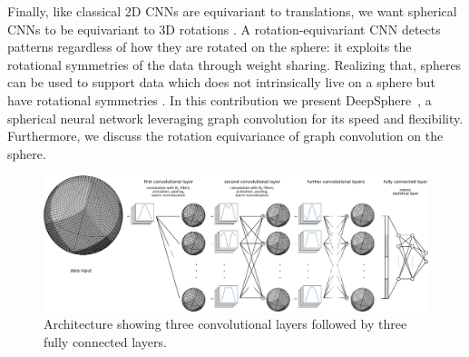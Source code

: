 \documentclass{article} %
\newcommand{\1}{\b{1}}              %
\newcommand{\0}{\b{0}}              %
\newcommand{\todo}[1]{{\color[rgb]{.6,.1,.6}{#1}}}
\begin{document}
Finally, like classical 2D CNNs are equivariant to translations, we want spherical CNNs to be equivariant to 3D rotations \citep{cohen2016equivariance, kondor2018equivariance}.
A rotation-equivariant CNN detects patterns regardless of how they are rotated on the sphere: it exploits the rotational symmetries of the data through weight sharing.
Realizing that, spheres can be used to support data which does not intrinsically live on a sphere but have rotational symmetries \citep[for 3D objects and molecules]{cohen2018sphericalcnn, esteves2017sphericalcnn}.
In this contribution we present DeepSphere~\citep{perraudin2018deepsphere}, a spherical neural network leveraging graph convolution for its speed and flexibility.
Furthermore, we discuss the rotation equivariance of graph convolution on the sphere.



\begin{figure}[t!]
	\centering
	\includegraphics[width=0.9\linewidth]{figure_architecture_v3}
	\caption{Architecture showing three convolutional layers followed by three fully connected layers.
	}
	\label{fig:architecture}
\end{figure}
\end{document}
